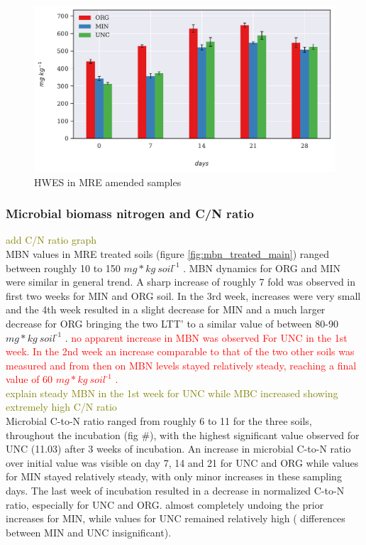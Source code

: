 \documentclass[12pt]{report}
\newcommand{\myRed}[1]{\textcolor{red}{#1}} %
\newcommand{\myGreen}[1]{\textcolor{olive}{#1}} %
\newlength{\SpaceAfterUnit}
\newcommand{\genericunit}{$ mg * kg\ soil^{\text{-}1}$ \hspace*{\SpaceAfterUnit}}
\begin{document}
		\begin{figure}[H]
			\centering
			\includegraphics[scale=0.8]{thesis_figures/main_incubation/MRE_treated/HWES.pdf}
			\caption{HWES in MRE amended samples}
			\label{fig:hwes_treated_main}
		\end{figure}
		
		
	\subsubsection{Microbial biomass nitrogen and C/N ratio}
		\myGreen{add C/N ratio graph}\\
		MBN values in MRE treated soils (figure \ref{fig:mbn_treated_main}) ranged between roughly 10 to 150 \genericunit. MBN dynamics for ORG and MIN were similar in general trend. A sharp increase of roughly  7 fold was observed in first two weeks for MIN and ORG soil. In the 3rd week, increases were very small and the 4th week resulted in a slight decrease for MIN and a much larger decrease for ORG bringing the two LTT’ to a similar value of between 80-90 \genericunit. \myRed{no apparent increase in MBN was observed For UNC in the 1st week. In the 2nd week an increase comparable to that of the two other soils was measured and from then on MBN levels stayed relatively steady, reaching a final value of 60 \genericunit. }\\
		\myGreen{explain steady MBN in the 1st week for UNC while MBC increased showing extremely high C/N ratio}\\
		Microbial C-to-N ratio ranged from roughly 6 to 11 for the three soils,  throughout the incubation (fig \#), with the highest significant value observed for UNC (11.03) after 3 weeks of incubation. 
		An increase in microbial C-to-N ratio over initial value was visible on day 7, 14 and 21 for UNC and ORG while values for MIN stayed relatively steady, with only minor increases in these sampling days. The last week of incubation resulted in a decrease in normalized C-to-N ratio,  especially for UNC and ORG. almost completely undoing the prior increases for MIN, while values for UNC remained relatively high ( differences between MIN and UNC insignificant).
\end{document}
